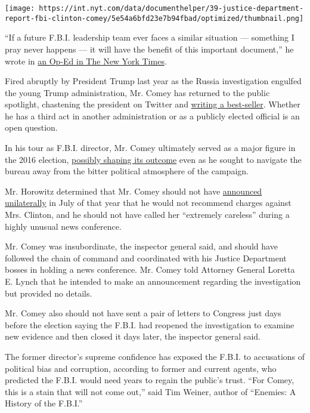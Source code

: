 \texttt{[image: https://int.nyt.com/data/documenthelper/39-justice-department-report-fbi-clinton-comey/5e54a6bfd23e7b94fbad/optimized/thumbnail.png]}

``If a future F.B.I. leadership team ever faces a similar situation ---
something I pray never happens --- it will have the benefit of this
important document,'' he wrote in
\href{https://www.nytimes.com/2018/06/14/opinion/comey-clinton-inspector-general.html}{an
Op-Ed in The New York Times}.

Fired abruptly by President Trump last year as the Russia investigation
engulfed the young Trump administration, Mr. Comey has returned to the
public spotlight, chastening the president on Twitter and
\href{https://www.nytimes.com/2018/04/12/us/politics/trump-comey-book.html}{writing
a best-seller}. Whether he has a third act in another administration or
as a publicly elected official is an open question.

In his tour as F.B.I. director, Mr. Comey ultimately served as a major
figure in the 2016 election,
\href{https://www.nytimes.com/2018/06/14/upshot/did-comey-cost-clinton-the-election-why-well-never-know.html?action=click\&module=Well\&pgtype=Homepage}{possibly
shaping its outcome} even as he sought to navigate the bureau away from
the bitter political atmosphere of the campaign.

Mr. Horowitz determined that Mr. Comey should not have
\href{https://www.nytimes.com/2016/07/06/us/politics/hillary-clinton-fbi-email-comey.html}{announced
unilaterally} in July of that year that he would not recommend charges
against Mrs. Clinton, and he should not have called her ``extremely
careless'' during a highly unusual news conference.

Mr. Comey was insubordinate, the inspector general said, and should have
followed the chain of command and coordinated with his Justice
Department bosses in holding a news conference. Mr. Comey told Attorney
General Loretta E. Lynch that he intended to make an announcement
regarding the investigation but provided no details.

Mr. Comey also should not have sent a pair of letters to Congress just
days before the election saying the F.B.I. had reopened the
investigation to examine new evidence and then closed it days later, the
inspector general said.

The former director's supreme confidence has exposed the F.B.I. to
accusations of political bias and corruption, according to former and
current agents, who predicted the F.B.I. would need years to regain the
public's trust. ``For Comey, this is a stain that will not come out,''
said Tim Weiner, author of ``Enemies: A History of the F.B.I.''

